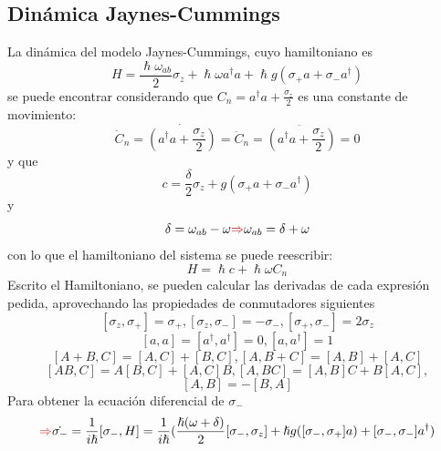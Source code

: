 \documentclass{book}
\begin{document}
       \subsection{Dinámica Jaynes-Cummings} La dinámica del modelo Jaynes-Cummings, cuyo hamiltoniano es
       \begin{equation}{H=\frac{\hslash\omega_{ab}}{2}\sigma_z+\hslash\omega a^\dag a+\hslash g(\sigma_+ a+\sigma_- a^\dag)} \end{equation} se puede encontrar considerando que ${C_n=a^\dag a +\frac{\sigma_z}{2}}$ es una constante de movimiento: \begin{equation}{\dot{C}_n=\dot{(a^\dag a +\frac{\sigma_z}{2})}=\ddot{C}_n=\ddot{(a^\dag a +\frac{\sigma_z}{2})} =0} \end{equation} y que \begin{equation}{c=\frac{\delta}{2}\sigma_z+g(\sigma_+a+\sigma_-a^\dag)} \end{equation}
       y \begin{equation}{\delta=\omega_{ab}-\omega\textcolor{red}{\Rightarrow} \omega_{ab}=\delta+\omega} \end{equation} con lo que el hamiltoniano del sistema se puede reescribir:
       \begin{equation}{ H=\hslash c+\hslash\omega C_n} \end{equation}
     Escrito el Hamiltoniano, se pueden calcular las derivadas de cada expresión pedida, aprovechando las propiedades de conmutadores siguientes
       \begin{equation}{[\sigma_z,\sigma_+]=\sigma_+,[\sigma_z,\sigma_-]=-\sigma_-, [\sigma_+,\sigma_-]=2\sigma_z} \end{equation} \begin{equation}{[a,a]=[a^\dag,a^\dag]=0, [a,a^\dag]=1} \end{equation}
       \begin{equation}{ [A+B,C]=[A,C]+[B,C], [A,B+C]=[A,B]+[A,C]}\end{equation} \begin{equation}{[AB,C]=A[B,C]+[A,C]B,[A,BC]=[A,B]C+B[A,C],} \end{equation} \begin{equation}{ [A,B]=-[B,A]} \end{equation}
       Para obtener la ecuación diferencial de ${\sigma_-}$
       \begin{equation}{ \textcolor{red}{\Rightarrow} \dot{\sigma_-}=\frac{1}{i\hslash}[\sigma_-,H]=\frac{1}{i\hslash}(\frac{\hslash(\omega+\delta)}{2}[\sigma_-,\sigma_z]+\hslash g([\sigma_-,\sigma_+]a)+[\sigma_-,\sigma_-]a^\dag)} \end{equation}
\end{document}
